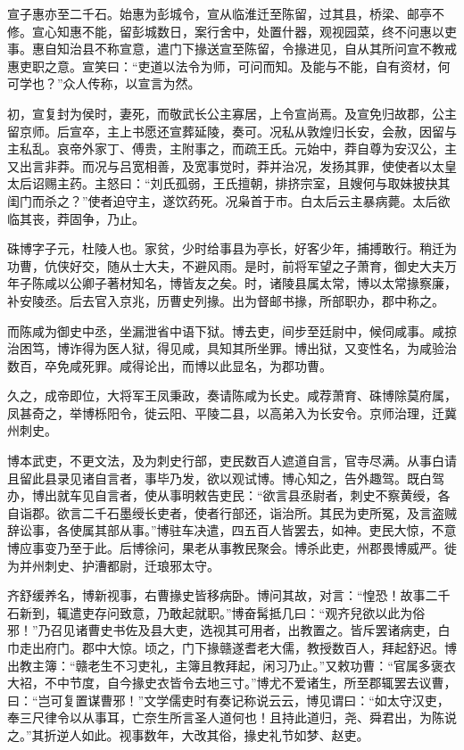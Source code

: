 \documentclass[12pt,UTF8]{ctexbook}
\begin{document}
宣子惠亦至二千石。始惠为彭城令，宣从临淮迁至陈留，过其县，桥梁、邮亭不修。宣心知惠不能，留彭城数日，案行舍中，处置什器，观视园菜，终不问惠以吏事。惠自知治县不称宣意，遣门下掾送宣至陈留，令掾进见，自从其所问宣不教戒惠吏职之意。宣笑曰：“吏道以法令为师，可问而知。及能与不能，自有资材，何可学也？”众人传称，以宣言为然。



初，宣复封为侯时，妻死，而敬武长公主寡居，上令宣尚焉。及宣免归故郡，公主留京师。后宣卒，主上书愿还宣葬延陵，奏可。况私从敦煌归长安，会赦，因留与主私乱。哀帝外家丁、傅贵，主附事之，而疏王氏。元始中，莽自尊为安汉公，主又出言非莽。而况与吕宽相善，及宽事觉时，莽并治况，发扬其罪，使使者以太皇太后诏赐主药。主怒曰：“刘氏孤弱，王氏擅朝，排挤宗室，且嫂何与取妹披抉其闺门而杀之？”使者迫守主，遂饮药死。况枭首于市。白太后云主暴病薨。太后欲临其丧，莽固争，乃止。



硃博字子元，杜陵人也。家贫，少时给事县为亭长，好客少年，捕搏敢行。稍迁为功曹，伉侠好交，随从士大夫，不避风雨。是时，前将军望之子萧育，御史大夫万年子陈咸以公卿子著材知名，博皆友之矣。时，诸陵县属太常，博以太常掾察廉，补安陵丞。后去官入京兆，历曹史列掾。出为督邮书掾，所部职办，郡中称之。



而陈咸为御史中丞，坐漏泄省中语下狱。博去吏，间步至廷尉中，候伺咸事。咸掠治困笃，博诈得为医人狱，得见咸，具知其所坐罪。博出狱，又变性名，为咸验治数百，卒免咸死罪。咸得论出，而博以此显名，为郡功曹。



久之，成帝即位，大将军王凤秉政，奏请陈咸为长史。咸荐萧育、硃博除莫府属，凤甚奇之，举博栎阳令，徙云阳、平陵二县，以高弟入为长安令。京师治理，迁冀州刺史。



博本武吏，不更文法，及为刺史行部，吏民数百人遮道自言，官寺尽满。从事白请且留此县录见诸自言者，事毕乃发，欲以观试博。博心知之，告外趣驾。既白驾办，博出就车见自言者，使从事明敕告吏民：“欲言县丞尉者，刺史不察黄绶，各自诣郡。欲言二千石墨绶长吏者，使者行部还，诣治所。其民为吏所冤，及言盗贼辞讼事，各使属其部从事。”博驻车决遣，四五百人皆罢去，如神。吏民大惊，不意博应事变乃至于此。后博徐问，果老从事教民聚会。博杀此吏，州郡畏博威严。徙为并州刺史、护漕都尉，迁琅邪太守。



齐舒缓养名，博新视事，右曹掾史皆移病卧。博问其故，对言：“惶恐！故事二千石新到，辄遣吏存问致意，乃敢起就职。”博奋髯抵几曰：“观齐兒欲以此为俗邪！”乃召见诸曹史书佐及县大吏，选视其可用者，出教置之。皆斥罢诸病吏，白巾走出府门。郡中大惊。顷之，门下掾赣遂耆老大儒，教授数百人，拜起舒迟。博出教主簿：“赣老生不习吏礼，主簿且教拜起，闲习乃止。”又敕功曹：“官属多褒衣大袑，不中节度，自今掾史衣皆令去地三寸。”博尤不爱诸生，所至郡辄罢去议曹，曰：“岂可复置谋曹邪！”文学儒吏时有奏记称说云云，博见谓曰：“如太守汉吏，奉三尺律令以从事耳，亡奈生所言圣人道何也！且持此道归，尧、舜君出，为陈说之。”其折逆人如此。视事数年，大改其俗，掾史礼节如梦、赵吏。
\end{document}
